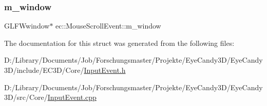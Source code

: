 \mbox{\label{structec_1_1_mouse_scroll_event_a76f795ff6bd0629d496005b8e415552a}} 
\subsubsection{\texorpdfstring{m\+\_\+window}{m\_window}}
{\footnotesize\ttfamily G\+L\+F\+Wwindow$\ast$ ec\+::\+Mouse\+Scroll\+Event\+::m\+\_\+window}



The documentation for this struct was generated from the following files\+:\begin{DoxyCompactItemize}
\item 
D\+:/\+Library/\+Documents/\+Job/\+Forschungsmaster/\+Projekte/\+Eye\+Candy3\+D/\+Eye\+Candy3\+D/include/\+E\+C3\+D/\+Core/\mbox{\hyperlink{_input_event_8h}{Input\+Event.\+h}}\item 
D\+:/\+Library/\+Documents/\+Job/\+Forschungsmaster/\+Projekte/\+Eye\+Candy3\+D/\+Eye\+Candy3\+D/src/\+Core/\mbox{\hyperlink{_input_event_8cpp}{Input\+Event.\+cpp}}\end{DoxyCompactItemize}
